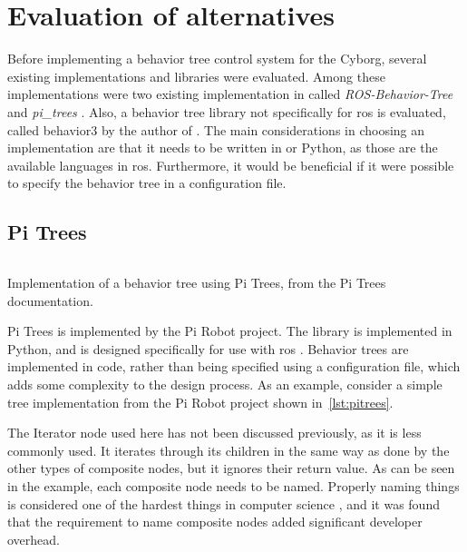\documentclass[\rootfolder/main.tex]{subfiles}
\begin{document}
\section{Evaluation of alternatives}

Before implementing a behavior tree control system for the Cyborg, several existing implementations and libraries were evaluated.
Among these implementations were two existing implementation in  called \emph{ROS-Behavior-Tree} \cite{Colledanchise} and \emph{pi\_trees} \cite{Goebel}.
Also, a behavior tree library not specifically for \acrshort{ros} is evaluated, called behavior3 by the author of \cite{Pereira2015}.
The main considerations in choosing an implementation are that it needs to be written in \CC or Python, as those are the available languages in \acrshort{ros}.
Furthermore, it would be beneficial if it were possible to specify the behavior tree in a configuration file.

\subsection{Pi Trees}

\begin{listing}
    \inputminted[fontsize=\scriptsize]{Python}{\rootfolder/Chapters/Chapter3/Listings/pitrees.py}
    \caption[Implementation of a behavior tree using Pi Trees.]{Implementation of a behavior tree using Pi Trees, from the Pi Trees documentation.}
    \label{lst:pitrees}
\end{listing}

Pi Trees is implemented by the Pi Robot project.
The library is implemented in Python, and is designed specifically for use with \acrshort{ros} \cite{Goebel}.
Behavior trees are implemented in code, rather than being specified using a configuration file, which adds some complexity to the design process.
As an example, consider a simple tree implementation from the Pi Robot project \cite{PiRobot} shown in~\cref{lst:pitrees}.

The Iterator node used here has not been discussed previously, as it is less commonly used.
It iterates through its children in the same way as done by the other types of composite nodes, but it ignores their return value.
As can be seen in the example, each composite node needs to be named.
Properly naming things is considered one of the hardest things in computer science \cite{Fowler}, and it was found that the requirement to name composite nodes added significant developer overhead.
\end{document}
